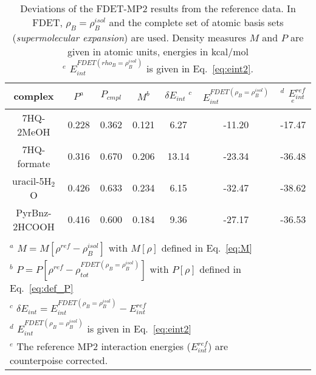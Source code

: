\documentclass[journal=jctcce,manuscript=article]{achemso}
\newcommand{\nr}[1]{\color{red}#1\color{black}}
\begin{document}
\begin{table*}
{
\begin{center}
\begin{tabular}{|c|c|c|c|c|c|c|}
\hline
 complex & $P^a$ & $P_{cmpl}$ & $M^b$ & $\delta E_{int}\;^c$&$E^{FDET(\rho_B=\rho_B^{isol})}_{int}$ &$^d$ $E_{int}^{ref}$ $^e$ \\ \hline
7HQ-2MeOH & 0.228 & 0.362 & 0.121 & 6.27 & -11.20 & -17.47 \\ \hline
7HQ-formate & 0.316 & 0.670 & 0.206 &  13.14 & -23.34 & -36.48 \\ \hline
uracil-5H$_2$O & 0.426 & 0.633 & 0.234 & 6.15 & -32.47 & -38.62 \\ \hline
PyrBnz-2HCOOH  & 0.416 & 0.600 & 0.184 & 9.36 & -27.17 &  -36.53 \\ \hline
\multicolumn{6}{c}{ } \\
\multicolumn{6}{l}{$^a$ $M=M[\rho^{ref} - \rho^{isol}_{B}]$ with $M[\rho]$ defined in Eq.~\ref{eq:M}}\\
\multicolumn{6}{l}{$^b$ $P=P[\rho^{ref} - \rho_{tot}^{FDET(\rho_B=\rho_B^{isol})}]$ with $P[\rho]$ defined in Eq.~\ref{eq:def_P}}\\
\multicolumn{6}{l}{$^c$ $\delta E_{int}=E^{FDET(\rho_B=\rho_B^{isol})}_{int}-E_{int}^{ref}$} \\
\multicolumn{6}{l}{$^d$ $E^{FDET(\rho_B=\rho_B^{isol})}_{int}$ is given in Eq.~\ref{eq:eint2}}\\
\multicolumn{6}{l}{$^e$ The reference MP2 interaction energies ($E_{int}^{ref}$) are \nr{counterpoise } corrected.}
\end{tabular}
\end{center}
}%
\caption{Deviations of the FDET-MP2 results from the reference data.  In FDET, $\rho_B=\rho_B^{isol}$  and the complete set of atomic basis sets ({\it supermolecular expansion}) are used. 
Density measures $M$ and $P$ are given in atomic units, energies in kcal/mol\\
$^e$ $E^{FDET(rho_B=\rho_B^{isol})}_{int}$ is given in Eq.~\ref{eq:eint2}.
}
\label{table:SE_isol}
\end{table*}
\end{document}
